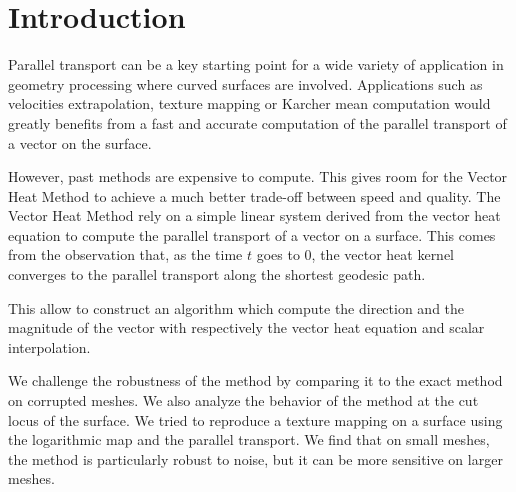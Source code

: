 \documentclass[sigconf, nonacm]{acmart}
\begin{document}



\maketitle

\section{Introduction}
Parallel transport can be a key starting point for a wide variety of application in geometry processing where curved surfaces are involved. Applications such as velocities extrapolation, texture mapping or Karcher mean computation would greatly benefits from a fast and accurate computation of the parallel transport of a vector on the surface.

However, past methods are expensive to compute. This gives room for the Vector Heat Method \cite{Sharp:2019:VHM} to achieve a much better trade-off between speed and quality. The Vector Heat Method rely on a simple linear system derived from the vector heat equation to compute the parallel transport of a vector on a surface. This comes from the observation that, as the time $t$ goes to 0, the vector heat kernel converges to the parallel transport along the shortest geodesic path.

This allow to construct an algorithm which compute the direction and the magnitude of the vector with respectively the vector heat equation and scalar interpolation.

We challenge the robustness of the method by comparing it to the exact method on corrupted meshes. We also analyze the behavior of the method at the cut locus of the surface. We tried to reproduce a texture mapping on a surface using the logarithmic map and the parallel transport.
We find that on small meshes, the method is particularly robust to noise, but it can be more sensitive on larger meshes.
\end{document}

